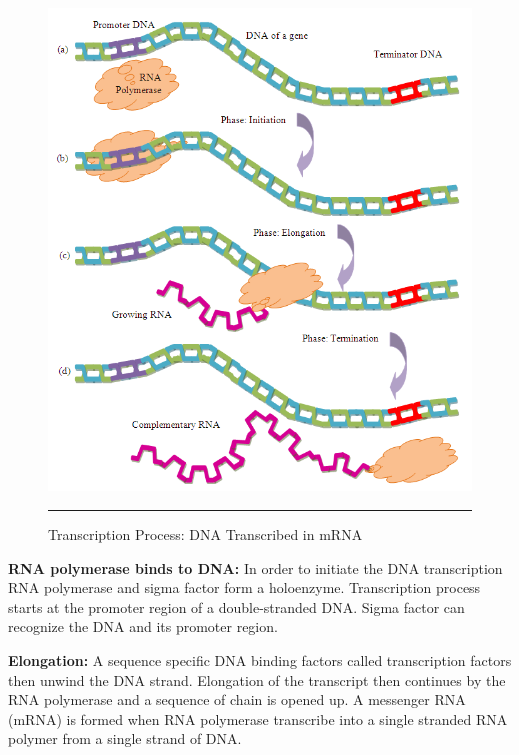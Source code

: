 \begin{figure}[htbp]
	\centering
		\includegraphics[scale=.6]{diagrams/transcriptionProcess.PNG}
		\rule{35em}{0.5pt}
	\caption{Transcription Process: DNA Transcribed in mRNA}
	\label{fig:transcriptionProcess}
\end{figure}


\textbf{RNA polymerase binds to DNA:} In order to initiate the DNA transcription RNA polymerase and 
sigma factor form a holoenzyme. Transcription process starts at the promoter region of a 
double-stranded DNA. Sigma factor can recognize the DNA and its promoter region. 

\textbf{Elongation:} A sequence specific DNA binding factors called transcription factors then unwind 
the DNA strand. Elongation of the transcript then continues by the RNA polymerase and a 
sequence of chain is opened up. A messenger RNA (mRNA) is formed when RNA polymerase transcribe 
into a single stranded RNA polymer from a single strand of DNA.


